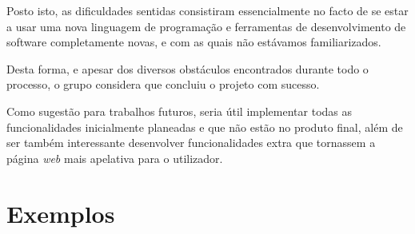 \documentclass[11pt,a4paper]{report}
\begin{document}
Posto isto, as dificuldades sentidas consistiram essencialmente no facto de se estar a usar uma nova linguagem de programação e ferramentas de desenvolvimento de software completamente novas, e com as quais não estávamos familiarizados.

Desta forma, e apesar dos diversos obstáculos encontrados durante todo o processo, o grupo considera que concluiu o projeto com sucesso.

Como sugestão para trabalhos futuros, seria útil implementar todas as funcionalidades inicialmente planeadas e que não estão no produto final, além de ser também interessante desenvolver funcionalidades extra que tornassem a página \emph{web} mais apelativa para o utilizador.

\appendix
\chapter{Exemplos}
\end{document}
